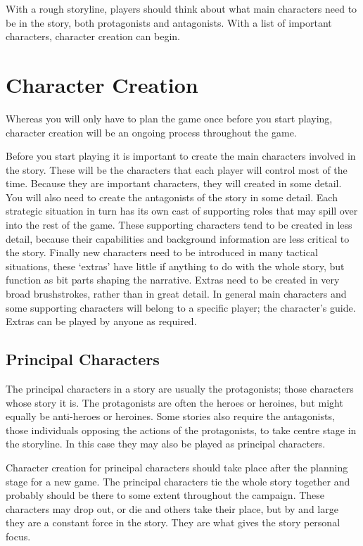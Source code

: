 \documentclass[twoside]{book}
\begin{document}
With a rough storyline, players should think about what main
characters need to be in the story, both protagonists and
antagonists. With a list of important characters, character creation
can begin.

\section{Character Creation}

Whereas you will only have to plan the game once before you start
playing, character creation will be an ongoing process throughout the
game.

Before you start playing it is important to create the main characters
involved in the story. These will be the characters that each player
will control most of the time. Because they are important characters,
they will created in some detail. You will also need to create the
antagonists of the story in some detail. Each strategic situation in
turn has its own cast of supporting roles that may spill over into the
rest of the game. These supporting characters tend to be created in
less detail, because their capabilities and background information are
less critical to the story. Finally new characters need to be
introduced in many tactical situations, these `extras' have little if
anything to do with the whole story, but function as bit parts shaping
the narrative. Extras need to be created in very broad brushstrokes,
rather than in great detail. In general main characters and some
supporting characters will belong to a specific player; the
character's guide. Extras can be played by anyone as required.

\subsection{Principal Characters}

The principal characters in a story are usually the protagonists;
those characters whose story it is. The protagonists are often the
heroes or heroines, but might equally be anti-heroes or heroines. Some
stories also require the antagonists, those individuals opposing the
actions of the protagonists, to take centre stage in the storyline. In
this case they may also be played as principal characters.

Character creation for principal characters should take place after
the planning stage for a new game. The principal characters tie the
whole story together and probably should be there to some extent
throughout the campaign. These characters may drop out, or die and
others take their place, but by and large they are a constant force in
the story. They are what gives the story personal focus.
\end{document}
